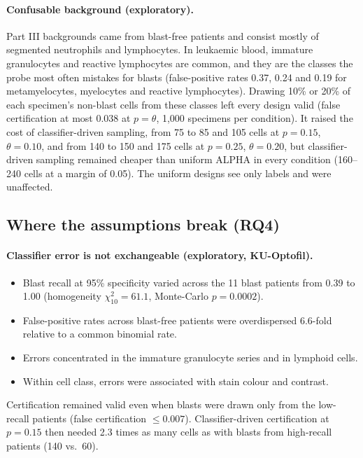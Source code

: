 \documentclass[11pt]{article}
\theoremstyle{remark}
\theoremstyle{definition}
\begin{document}
\paragraph{Confusable background (exploratory).} Part III backgrounds came from blast-free patients and consist mostly of segmented neutrophils and lymphocytes. In leukaemic blood, immature granulocytes and reactive lymphocytes are common, and they are the classes the probe most often mistakes for blasts (false-positive rates 0.37, 0.24 and 0.19 for metamyelocytes, myelocytes and reactive lymphocytes). Drawing 10\% or 20\% of each specimen's non-blast cells from these classes left every design valid (false certification at most 0.038 at $p=\theta$, 1,000 specimens per condition). It raised the cost of classifier-driven sampling, from 75 to 85 and 105 cells at $p=0.15$, $\theta=0.10$, and from 140 to 150 and 175 cells at $p=0.25$, $\theta=0.20$, but classifier-driven sampling remained cheaper than uniform ALPHA in every condition (160--240 cells at a margin of 0.05). The uniform designs see only labels and were unaffected.


\subsection{Where the assumptions break (RQ4)}\label{sec:rq4}
\paragraph{Classifier error is not exchangeable (exploratory, KU-Optofil).}
\begin{itemize}
\item Blast recall at 95\% specificity varied across the 11 blast patients from 0.39 to 1.00 (homogeneity $\chi^2_{10}=61.1$, Monte-Carlo $p=0.0002$).
\item False-positive rates across blast-free patients were overdispersed 6.6-fold relative to a common binomial rate.
\item Errors concentrated in the immature granulocyte series and in lymphoid cells.
\item Within cell class, errors were associated with stain colour and contrast.
\end{itemize}
Certification remained valid even when blasts were drawn only from the low-recall patients (false certification $\le0.007$). Classifier-driven certification at $p=0.15$ then needed 2.3 times as many cells as with blasts from high-recall patients (140 vs.\ 60).
\end{document}
